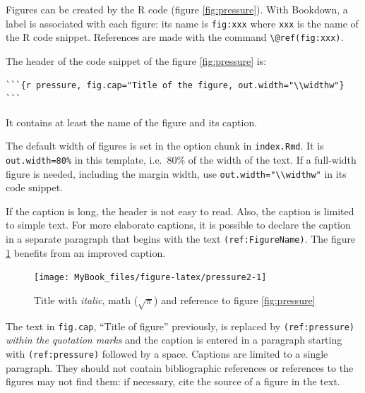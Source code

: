\documentclass[
  12pt,
  american,
  a4paper,
  extrafontsizes,onecolumn,openright
  ]{memoir}
\newlength\widthw %
\begin{document}
\normalsize

Figures can be created by the R code (figure \ref{fig:pressure}).
With Bookdown, a label is associated with each figure: its name is \texttt{fig:xxx} where \texttt{xxx} is the name of the R code snippet.
References are made with the command \texttt{\textbackslash{}@ref(fig:xxx)}.

The header of the code snippet of the figure \ref{fig:pressure} is:

\begin{verbatim}
```{r pressure, fig.cap="Title of the figure, out.width="\\widthw"}
```
\end{verbatim}

It contains at least the name of the figure and its caption.

The default width of figures is set in the option chunk in \texttt{index.Rmd}.
It is \texttt{out.width=\textquotesingle{}80\%\textquotesingle{}} in this template, i.e.~80\% of the width of the text.
If a full-width figure is needed, including the margin width, use \texttt{out.width="\textbackslash{}\textbackslash{}widthw"} in its code snippet.

If the caption is long, the header is not easy to read.
Also, the caption is limited to simple text.
For more elaborate captions, it is possible to declare the caption in a separate paragraph that begins with the text \texttt{(ref:FigureName)}.
The figure \ref{fig:pressure2} benefits from an improved caption.



\scriptsize

\begin{figure}

{\centering \texttt{[image: MyBook\_files/figure-latex/pressure2-1]} 

}

\caption{Title with \emph{italic}, math (\(\sqrt\pi\)) and reference to figure \ref{fig:pressure}}\label{fig:pressure2}
\end{figure}

\normalsize

The text in \texttt{fig.cap}, \enquote{Title of figure} previously, is replaced by \texttt{(ref:pressure)} \emph{within the quotation marks} and the caption is entered in a paragraph starting with \texttt{(ref:pressure)} followed by a space.
Captions are limited to a single paragraph.
They should not contain bibliographic references or references to the figures may not find them: if necessary, cite the source of a figure in the text.
\end{document}
